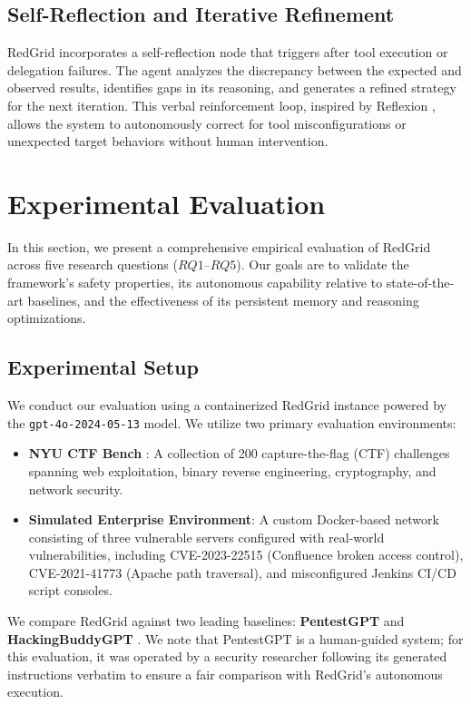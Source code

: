 \documentclass[conference,compsoc]{IEEEtran}
\begin{document}
\subsection{Self-Reflection and Iterative Refinement}
RedGrid incorporates a self-reflection node that triggers after tool execution or delegation failures. The agent analyzes the discrepancy between the expected and observed results, identifies gaps in its reasoning, and generates a refined strategy for the next iteration. This verbal reinforcement loop, inspired by Reflexion \cite{reflexion}, allows the system to autonomously correct for tool misconfigurations or unexpected target behaviors without human intervention.

\section{Experimental Evaluation} \label{sec:eval}
In this section, we present a comprehensive empirical evaluation of RedGrid across five research questions ($RQ1$--$RQ5$). Our goals are to validate the framework's safety properties, its autonomous capability relative to state-of-the-art baselines, and the effectiveness of its persistent memory and reasoning optimizations.

\subsection{Experimental Setup}
We conduct our evaluation using a containerized RedGrid instance powered by the \texttt{gpt-4o-2024-05-13} model. We utilize two primary evaluation environments:
\begin{itemize}
    \item \textbf{NYU CTF Bench} \cite{nyuctf}: A collection of 200 capture-the-flag (CTF) challenges spanning web exploitation, binary reverse engineering, cryptography, and network security.
    \item \textbf{Simulated Enterprise Environment}: A custom Docker-based network consisting of three vulnerable servers configured with real-world vulnerabilities, including CVE-2023-22515 (Confluence broken access control), CVE-2021-41773 (Apache path traversal), and misconfigured Jenkins CI/CD script consoles.
\end{itemize}

We compare RedGrid against two leading baselines: \textbf{PentestGPT} \cite{pentestgpt} and \textbf{HackingBuddyGPT} \cite{hackingbuddygpt}. We note that PentestGPT is a human-guided system; for this evaluation, it was operated by a security researcher following its generated instructions verbatim to ensure a fair comparison with RedGrid's autonomous execution.
\end{document}
